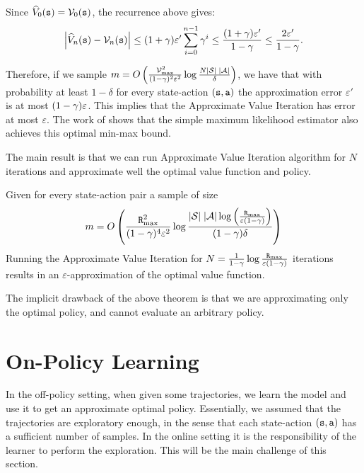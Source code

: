 Since $\widehat{V}_0({\tt s}) = \mathcal{V}_0({\tt s})$, the recurrence above gives:
\[
\left|\widehat{V}_n({\tt s}) - \mathcal{V}_n({\tt s})\right|\leq (1+\gamma)\varepsilon'\sum_{i=0}^{n-1}\gamma^i \leq \frac{(1+\gamma)\varepsilon'}{1-\gamma} \leq \frac{2\varepsilon'}{1-\gamma}.
\]

Therefore, if we sample $m=O\left(\frac{\mathcal{V}^2_{\max}}{(1-\gamma)^2\varepsilon^2}\log \frac{N
|\mathcal{S}| \;|\mathcal{A}|}{\delta}\right)$, we have that with probability at least
$1-\delta$ for every state-action $({\tt s},{\tt a})$ the approximation error $\varepsilon'$ is
at most $(1-\gamma)\varepsilon$. This implies that the Approximate Value
Iteration has error at most $\varepsilon$.
The work of \cite{AgarwalKY20} shows that the simple maximum likelihood estimator also achieves this optimal min-max bound.


The main result is that we can run Approximate Value Iteration
algorithm for $N$ iterations and approximate well the optimal value
function and policy.

\begin{theorem}
\label{theorem:avi-near-opt}
Given for every state-action pair a sample of size
\[
m=O\left(\frac{{\tt R}_{\max }^2}{(1-\gamma)^4\varepsilon^2}\log \frac{ |\mathcal{S}| \;|\mathcal{A}|\log \left(
\frac{{\tt R}_{\max }}{\varepsilon(1-\gamma)} \right) }{(1-\gamma)\delta}\right)
\]
Running the Approximate Value Iteration for
$N=\frac{1}{1-\gamma}\log \frac{{\tt R}_{\max }}{\varepsilon(1-\gamma)}$
iterations results in an $\varepsilon$-approximation of the optimal value
function.
\end{theorem}

The implicit drawback of the above theorem is that we are
approximating only the optimal policy, and cannot evaluate an
arbitrary policy.

\section{On-Policy Learning}


In the off-policy setting, when given some trajectories, we learn the model and use it to get an approximate optimal
policy. Essentially, we assumed that the trajectories are
exploratory enough, in the sense that each state-action $({\tt s},{\tt a})$ has a
sufficient number of samples.
%
In the online setting it is the responsibility of the learner to
perform the exploration. This will be the main challenge of this section.


